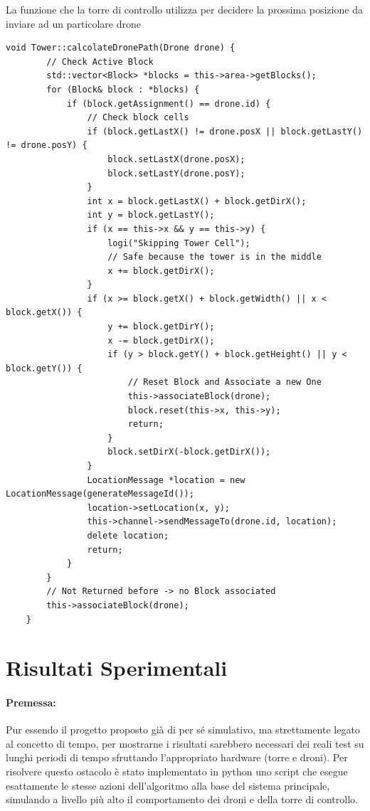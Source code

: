 \documentclass[a4paper, 11pt]{article}
\begin{document}
La funzione che la torre di controllo utilizza per decidere la prossima posizione da inviare ad un particolare drone
\begin{lstlisting}[style=customcpp, caption={da tower.cpp}]
    void Tower::calcolateDronePath(Drone drone) {
        // Check Active Block
        std::vector<Block> *blocks = this->area->getBlocks();
        for (Block& block : *blocks) {
            if (block.getAssignment() == drone.id) {
                // Check block cells
                if (block.getLastX() != drone.posX || block.getLastY() != drone.posY) {
                    block.setLastX(drone.posX);
                    block.setLastY(drone.posY);
                }
                int x = block.getLastX() + block.getDirX();
                int y = block.getLastY();
                if (x == this->x && y == this->y) {
                    logi("Skipping Tower Cell");
                    // Safe because the tower is in the middle
                    x += block.getDirX();
                }
                if (x >= block.getX() + block.getWidth() || x < block.getX()) {
                    y += block.getDirY();
                    x -= block.getDirX();
                    if (y > block.getY() + block.getHeight() || y < block.getY()) {
                        // Reset Block and Associate a new One
                        this->associateBlock(drone);
                        block.reset(this->x, this->y);
                        return;
                    }
                    block.setDirX(-block.getDirX());
                }
                LocationMessage *location = new LocationMessage(generateMessageId());
                location->setLocation(x, y);
                this->channel->sendMessageTo(drone.id, location);
                delete location; 
                return;
            }
        }
        // Not Returned before -> no Block associated
        this->associateBlock(drone);
    }
\end{lstlisting}
\section{Risultati Sperimentali}
\paragraph*{Premessa:} Pur essendo il progetto proposto già di per sé simulativo, ma strettamente legato al concetto di tempo, per mostrarne i risultati sarebbero necessari dei reali test su lunghi periodi di tempo sfruttando l'appropriato hardware (torre e droni).
Per risolvere questo ostacolo è stato implementato in python uno script che esegue esattamente le stesse azioni dell'algoritmo alla base del sistema principale, simulando a livello più alto il comportamento dei droni e della torre di controllo.
\end{document}
